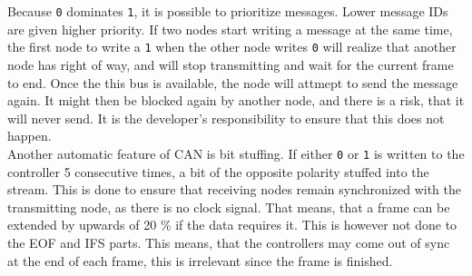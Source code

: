 Because \texttt{0} dominates \texttt{1}, it is possible to prioritize messages.
Lower message IDs are given higher priority.
If two nodes start writing a message at the same time, the first node to write a \texttt{1} when the other node writes \texttt{0} will realize that another node has right of way, and will stop transmitting and wait for the current frame to end.
Once the this bus is available, the node will attmept to send the message again.
It might then be blocked again by another node, and there is a risk, that it will never send.
It is the developer's responsibility to ensure that this does not happen.\\

Another automatic feature of CAN is bit stuffing.
If either \texttt{0} or \texttt{1} is written to the controller 5 consecutive times, a bit of the opposite polarity stuffed into the stream. 
This is done to ensure that receiving nodes remain synchronized with the transmitting node, as there is no clock signal.
That means, that a frame can be extended by upwards of 20 \% if the data requires it.
This is however not done to the EOF and IFS parts.
This means, that the controllers may come out of sync at the end of each frame, this is irrelevant since the frame is finished.
